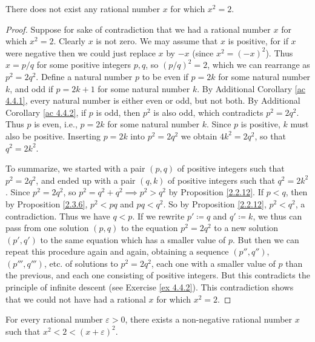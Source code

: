 \begin{proposition}\label{4.4.4}
    There does not exist any rational number \(x\) for which \(x^2 = 2\).
\end{proposition}

\begin{proof}
    Suppose for sake of contradiction that we had a rational number \(x\) for which \(x^2 = 2\).
    Clearly \(x\) is not zero.
    We may assume that \(x\) is positive, for if \(x\) were negative then we could just replace \(x\) by \(-x\)
    (since \(x^2 = (-x)^2\)).
    Thus \(x = p / q\) for some positive integers \(p, q\), so \((p / q)^2 = 2\), which we can rearrange as \(p^2 = 2q^2\).
    Define a natural number \(p\) to be even if \(p = 2k\) for some natural number \(k\), and odd if \(p = 2k + 1\) for some natural number \(k\).
    By Additional Corollary \ref{ac 4.4.1}, every natural number is either even or odd, but not both.
    By Additional Corollary \ref{ac 4.4.2}, if \(p\) is odd, then \(p^2\) is also odd, which contradicts \(p^2 = 2q^2\).
    Thus \(p\) is even, i.e., \(p = 2k\) for some natural number \(k\).
    Since \(p\) is positive, \(k\) must also be positive.
    Inserting \(p = 2k\) into \(p^2 = 2q^2\) we obtain \(4k^2 = 2q^2\), so that \(q^2 = 2k^2\).

    To summarize, we started with a pair \((p, q)\) of positive integers such that \(p^2 = 2q^2\), and ended up with a pair \((q, k)\) of positive integers such that \(q^2 = 2k^2\).
    Since \(p^2 = 2q^2\), so \(p^2 = q^2 + q^2 \implies p^2 > q^2\) by Proposition \ref{2.2.12}.
    If \(p < q\), then by Proposition \ref{2.3.6}, \(p^2 < pq\) and \(pq < q^2\).
    So by Proposition \ref{2.2.12}, \(p^2 < q^2\), a contradiction.
    Thus we have \(q < p\).
    If we rewrite \(p' \coloneqq q\) and \(q' \coloneqq k\), we thus can pass from one solution \((p, q)\) to the equation \(p^2 = 2q^2\) to a new solution \((p', q')\) to the same equation which has a smaller value of \(p\).
    But then we can repeat this procedure again and again, obtaining a sequence \((p'', q'')\), \((p''', q''')\), etc. of solutions to \(p^2 = 2q^2\), each one with a smaller value of \(p\) than the previous, and each one consisting of positive integers.
    But this contradicts the principle of infinite descent (see Exercise \ref{ex 4.4.2}).
    This contradiction shows that we could not have had a rational \(x\) for which \(x^2 = 2\).
\end{proof}

\begin{proposition}\label{4.4.5}
    For every rational number \(\varepsilon > 0\), there exists a non-negative rational number \(x\) such that \(x^2 < 2 < (x + \varepsilon)^2\).
\end{proposition}

